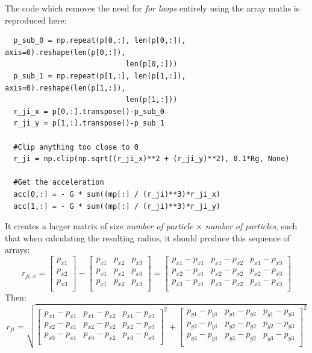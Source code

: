\documentclass[a4paper,12pt]{article}
\begin{document}
The code which removes the need for \textit{for loops} entirely using the array maths is reproduced here:
\begin{verbatim}
  p_sub_0 = np.repeat(p[0,:], len(p[0,:]), axis=0).reshape(len(p[0,:]), 
                            len(p[0,:]))
  p_sub_1 = np.repeat(p[1,:], len(p[1,:]), axis=0).reshape(len(p[1,:]), 
                            len(p[1,:]))
  r_ji_x = p[0,:].transpose()-p_sub_0
  r_ji_y = p[1,:].transpose()-p_sub_1

  #Clip anything too close to 0
  r_ji = np.clip(np.sqrt((r_ji_x)**2 + (r_ji_y)**2), 0.1*Rg, None)

  #Get the acceleration
  acc[0,:] = - G * sum((mp[:] / (r_ji)**3)*r_ji_x)
  acc[1,:] = - G * sum((mp[:] / (r_ji)**3)*r_ji_y)
\end{verbatim}

It creates a larger matrix of size \emph{number of particle} $\times$ \emph{number of particles}, such that when calculating the resulting radius, it should produce this sequence of arrays:
$$r_{ji,x} = \begin{bmatrix}
  p_{x1}\\
  p_{x2}\\
  p_{x3}\\
\end{bmatrix} - \begin{bmatrix}
  p_{x1} & p_{x2} & p_{x3}\\
  p_{x1} & p_{x2} & p_{x3}\\
  p_{x1} & p_{x2} & p_{x3}\\
\end{bmatrix} = \begin{bmatrix}
  p_{x1} - p_{x1} & p_{x1} - p_{x2} & p_{x1} - p_{x3}\\
  p_{x2} - p_{x1} & p_{x2} - p_{x2} & p_{x2} - p_{x3}\\
  p_{x3} - p_{x1} & p_{x3} - p_{x2} & p_{x3} - p_{x3}\\
\end{bmatrix}$$
Then:
$$r_{ji} = \sqrt{\begin{bmatrix}
  p_{x1} - p_{x1} & p_{x1} - p_{x2} & p_{x1} - p_{x3}\\
  p_{x2} - p_{x1} & p_{x2} - p_{x2} & p_{x2} - p_{x3}\\
  p_{x3} - p_{x1} & p_{x3} - p_{x2} & p_{x3} - p_{x3}\\
\end{bmatrix}^2 + \begin{bmatrix}
  p_{y1} - p_{y1} & p_{y1} - p_{y2} & p_{y1} - p_{y3}\\
  p_{y2} - p_{y1} & p_{y2} - p_{y2} & p_{y2} - p_{y3}\\
  p_{y3} - p_{y1} & p_{y3} - p_{y2} & p_{y3} - p_{y3}\\
\end{bmatrix}^2}$$
\end{document}
